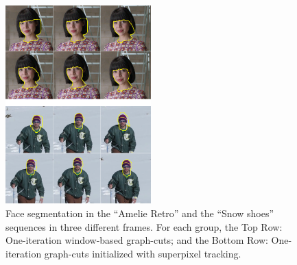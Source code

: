 {\begin{figure}[thpb]
      \label{figurelabel_comp}
   \end{figure}
}{
   \begin{figure}[thpb]
      \centering
      \includegraphics[width=0.5\textwidth]{../images/Compare.png}
      \caption{Face segmentation in the “Amelie Retro” and the
	      “Snow shoes” sequences in three different frames. For each
	       group, the Top Row: One-iteration window-based graph-cuts;
	       and the Bottom Row: One-iteration graph-cuts initialized with superpixel tracking.}
      \label{figurelabel_comp}
   \end{figure}
}
